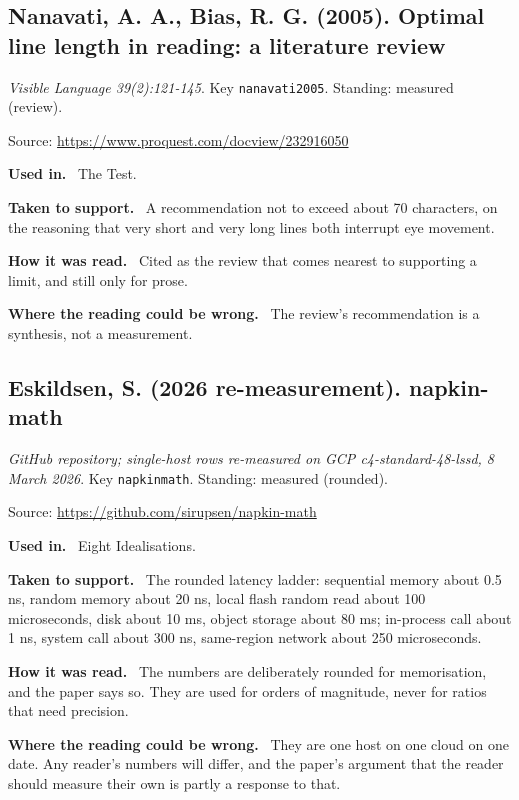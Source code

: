 \documentclass[11pt,oneside]{article}
\newcommand{\field}[1]{\par\noindent\textbf{\color{accent}#1.}\ }
\begin{document}
\hypertarget{src:nanavati2005}{}
\subsection*{Nanavati, A. A., Bias, R. G. (2005). Optimal line length in reading: a literature review}
\noindent\small\emph{Visible Language 39(2):121-145}. Key \texttt{nanavati2005}. Standing: measured (review).
\par\noindent\small Source: \url{https://www.proquest.com/docview/232916050}
\normalsize
\field{Used in} The Test.
\field{Taken to support} A recommendation not to exceed about 70 characters, on the reasoning that very short and very long lines both interrupt eye movement.
\field{How it was read} Cited as the review that comes nearest to supporting a limit, and still only for prose.
\field{Where the reading could be wrong} The review's recommendation is a synthesis, not a measurement.

\hypertarget{src:napkinmath}{}
\subsection*{Eskildsen, S. (2026 re-measurement). napkin-math}
\noindent\small\emph{GitHub repository; single-host rows re-measured on GCP c4-standard-48-lssd, 8 March 2026}. Key \texttt{napkinmath}. Standing: measured (rounded).
\par\noindent\small Source: \url{https://github.com/sirupsen/napkin-math}
\normalsize
\field{Used in} Eight Idealisations.
\field{Taken to support} The rounded latency ladder: sequential memory about 0.5 ns, random memory about 20 ns, local flash random read about 100 microseconds, disk about 10 ms, object storage about 80 ms; in-process call about 1 ns, system call about 300 ns, same-region network about 250 microseconds.
\field{How it was read} The numbers are deliberately rounded for memorisation, and the paper says so. They are used for orders of magnitude, never for ratios that need precision.
\field{Where the reading could be wrong} They are one host on one cloud on one date. Any reader's numbers will differ, and the paper's argument that the reader should measure their own is partly a response to that.

\hypertarget{src:naur1985}{}
\end{document}
